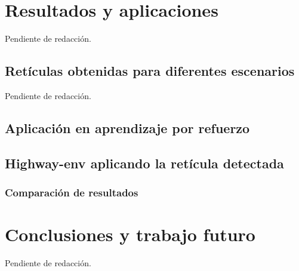 \documentclass[10pt,letterpaper,final]{report}
\newlength{\spacing}
\newcommand{\nspace}[1]{\setlength{\baselineskip}{#1\spacing}}
\newenvironment{linespacing}[1]{\nspace{#1}}{}
\begin{document}
\begin{linespacing}{1.5}
\clearpage
\chapter{Resultados y aplicaciones}
Pendiente de redacción.
\section{Retículas obtenidas para diferentes escenarios}
Pendiente de redacción.

\section{Aplicación en aprendizaje por refuerzo}


\section{Highway-env aplicando la retícula detectada}


\subsection{Comparación de resultados}

\clearpage
\chapter{Conclusiones y trabajo futuro}
Pendiente de redacción.

\end{linespacing}
\clearpage


\end{document}

